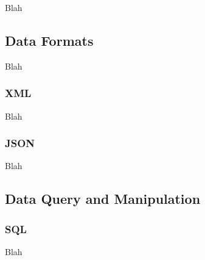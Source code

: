 Blah


\subsection{Data Formats}

Blah

\subsubsection{XML}

Blah

\subsubsection{JSON}

Blah


\subsection{Data Query and Manipulation}

\subsubsection{SQL}


Blah \\
